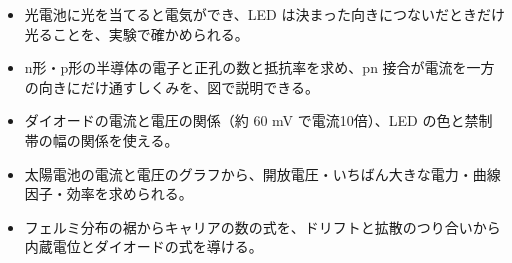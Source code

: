 \begin{goal}
\begin{itemize}[label={\color{bkTheme}●}, leftmargin=1.6\zw, itemsep=0pt, topsep=1pt]
\item {}\enspace 光電池に光を当てると電気ができ、LED は決まった向きにつないだときだけ光ることを、実験で確かめられる。
\item {}\enspace n形・p形の半導体の電子と正孔の数と抵抗率を求め、pn 接合が電流を一方の向きにだけ通すしくみを、図で説明できる。
\item {}\enspace ダイオードの電流と電圧の関係（約 60 mV で電流10倍）、LED の色と禁制帯の幅の関係を使える。
\item {}\enspace 太陽電池の電流と電圧のグラフから、開放電圧・いちばん大きな電力・曲線因子・効率を求められる。
\item {}\enspace フェルミ分布の裾からキャリアの数の式を、ドリフトと拡散のつり合いから内蔵電位とダイオードの式を導ける。
\end{itemize}
\end{goal}


